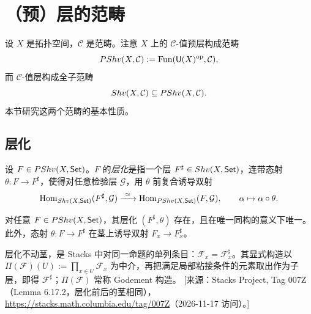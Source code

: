 
\section{（预）层的范畴}\label{sec:3}

设 $X$ 是拓扑空间，$\mathcal C$ 是范畴。注意 $X$ 上的 $\mathcal C$-值预层构成范畴
\[
PShv(X,\mathcal C):=\operatorname{Fun}(\mathsf{U}(X)^{\mathrm{op}},\mathcal C),
\]
而 $\mathcal C$-值层构成全子范畴
\[
Shv(X,\mathcal C)\subseteq PShv(X,\mathcal C).
\]
本节研究这两个范畴的基本性质。

\subsection{层化}\label{sec:3.1}

\begin{definition}\label{def:3.1.1}
设 $F\in PShv(X,\mathsf{Set})$。$F$ 的\emph{层化}是指一个层 $F^{\sharp}\in Shv(X,\mathsf{Set})$，连带态射 $\theta\colon F\to F^{\sharp}$，使得对任意检验层 $\mathcal G$，用 $\theta$ 前复合诱导双射
\[
\operatorname{Hom}_{Shv(X,\mathsf{Set})}(F^{\sharp},\mathcal G)\xrightarrow{\ \simeq\ }\operatorname{Hom}_{PShv(X,\mathsf{Set})}(F,\mathcal G),\qquad \alpha\mapsto\alpha\circ\theta.
\]
\end{definition}

\begin{proposition}\label{prop:3.1.2}
对任意 $F\in PShv(X,\mathsf{Set})$，其层化 $(F^{\sharp},\theta)$ 存在，且在唯一同构的意义下唯一。此外，态射 $\theta\colon F\to F^{\sharp}$ 在茎上诱导双射 $F_x\to F^{\sharp}_x$。
\end{proposition}

\begin{yizhu}
层化不动茎，是 Stacks 中对同一命题的单列条目：$\mathcal F_x=\mathcal F^{\sharp}_x$。其显式构造以 $\Pi(\mathcal F)(U):=\prod_{x\in U}\mathcal F_x$ 为中介，再把满足局部粘接条件的元素取出作为子层，即得 $\mathcal F^{\sharp}$；$\Pi(\mathcal F)$ 常称 Godement 构造。
[来源：Stacks Project, Tag 007Z（Lemma 6.17.2，层化前后的茎相同），\url{https://stacks.math.columbia.edu/tag/007Z}（2026-11-17 访问）。]
\end{yizhu}

